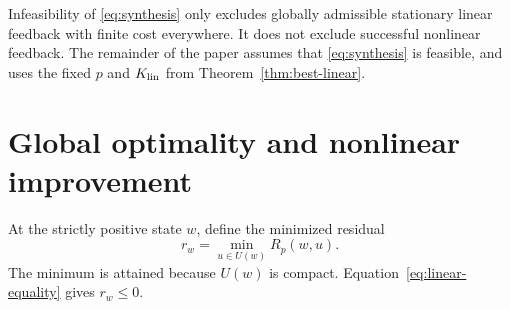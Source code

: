 \documentclass[10pt]{article}
\begin{document}
Infeasibility of \eqref{eq:synthesis} only excludes globally admissible stationary linear feedback with finite cost everywhere. It does not exclude successful nonlinear feedback. The remainder of the paper assumes that \eqref{eq:synthesis} is feasible, and uses the fixed $p$ and $K_{\rm lin}$ from Theorem~\ref{thm:best-linear}.

\section{Global optimality and nonlinear improvement}

At the strictly positive state $w$, define the minimized residual
\begin{equation}
 r_w=\min_{u\in U(w)}R_p(w,u).
 \label{eq:interior-test}
\end{equation}
The minimum is attained because $U(w)$ is compact. Equation~\eqref{eq:linear-equality} gives $r_w\le0$.
\end{document}
